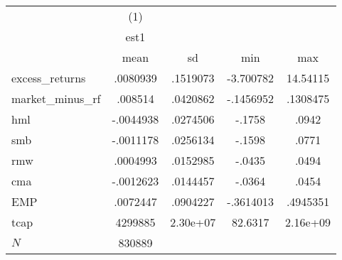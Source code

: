 {
\def\sym#1{\ifmmode^{#1}\else\(^{#1}\)\fi}
\begin{tabular}{l*{1}{cccc}}
\hline\hline
            &\multicolumn{1}{c}{(1)}&            &            &            \\
            &        est1&            &            &            \\
            &        mean&          sd&         min&         max\\
\hline
excess\_returns&    .0080939&    .1519073&   -3.700782&    14.54115\\
market\_minus\_rf&     .008514&    .0420862&   -.1456952&    .1308475\\
hml         &   -.0044938&    .0274506&      -.1758&       .0942\\
smb         &   -.0011178&    .0256134&      -.1598&       .0771\\
rmw         &    .0004993&    .0152985&      -.0435&       .0494\\
cma         &   -.0012623&    .0144457&      -.0364&       .0454\\
EMP         &    .0072447&    .0904227&   -.3614013&    .4945351\\
tcap        &     4299885&    2.30e+07&     82.6317&    2.16e+09\\
\hline
\(N\)       &      830889&            &            &            \\
\hline\hline
\end{tabular}
}
